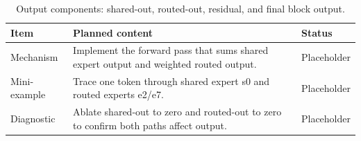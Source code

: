 \begin{table}[H]
\centering
\caption{Output components: shared-out, routed-out, residual, and final block output.}
\label{tab:ch08-combining-shared-and-routed-outputs}
\begin{tabularx}{\textwidth}{p{}X p{}}
\toprule
Item & Planned content & Status \\
\midrule
Mechanism & Implement the forward pass that sums shared expert output and weighted routed output. & Placeholder \\
Mini-example & Trace one token through shared expert s0 and routed experts e2/e7. & Placeholder \\
Diagnostic & Ablate shared-out to zero and routed-out to zero to confirm both paths affect output. & Placeholder \\
\bottomrule
\end{tabularx}
\end{table}
